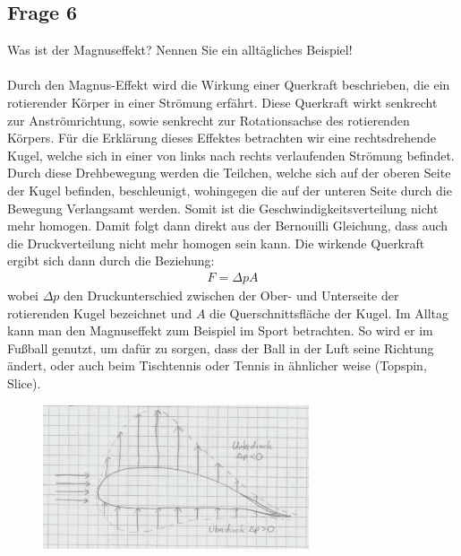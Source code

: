 \documentclass[a4paper,10pt]{scrartcl}
\begin{document}
		\subsection{Frage 6}
			Was ist der Magnuseffekt? Nennen Sie ein alltägliches Beispiel!\\
			\\
			Durch den Magnus-Effekt wird die Wirkung einer Querkraft beschrieben, die ein rotierender Körper in einer Strömung erfährt. Diese Querkraft wirkt senkrecht zur Anströmrichtung, sowie senkrecht zur Rotationsachse des rotierenden Körpers. Für die Erklärung dieses Effektes betrachten wir eine rechtsdrehende Kugel, welche sich in einer von links nach rechts verlaufenden Strömung befindet. Durch diese Drehbewegung werden die Teilchen, welche sich auf der oberen Seite der Kugel befinden, beschleunigt, wohingegen die auf der unteren Seite durch die Bewegung Verlangsamt werden. Somit ist die Geschwindigkeitsverteilung nicht mehr homogen. Damit folgt dann direkt aus der Bernouilli Gleichung, dass auch die Druckverteilung nicht mehr homogen sein kann. Die wirkende Querkraft ergibt sich dann durch die Beziehung:
			\begin{align*}
			F=\Delta p A
			\end{align*}
			wobei \(\Delta p\) den Druckunterschied zwischen der Ober- und Unterseite der rotierenden Kugel bezeichnet und \(A\) die Querschnittsfläche der Kugel. Im Alltag kann man den Magnuseffekt zum Beispiel im Sport betrachten. So wird er im Fußball genutzt, um dafür zu sorgen, dass der Ball in der Luft seine Richtung ändert, oder auch beim Tischtennis oder Tennis in ähnlicher weise (Topspin, Slice).
			\FloatBarrier
			\begin{figure}[h]
\centering
\includegraphics[width=0.7\textwidth]{./Bilder/wk2}

\end{figure}
\FloatBarrier
			
\end{document}
